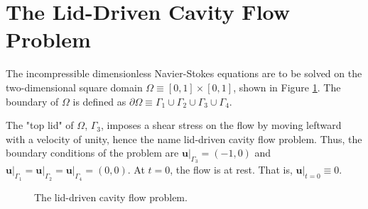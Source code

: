 \section{The Lid-Driven Cavity Flow Problem}

The incompressible dimensionless Navier-Stokes equations are to be solved on the two-dimensional square domain $\Omega \equiv \left[ 0, 1 \right] \times \left[ 0, 1 \right]$, shown in Figure \ref{fig:problem}. The boundary of $\Omega$ is defined as $\partial \Omega \equiv \Gamma_1 \cup \Gamma_2 \cup \Gamma_3 \cup \Gamma_4$. 

The "top lid" of $\Omega$, $\Gamma_3$, imposes a shear stress on the flow by moving leftward with a velocity of unity, hence the name lid-driven cavity flow problem. Thus, the boundary conditions of the problem are $\left. \mathbf{u} \right|_{\Gamma_3} = (-1, 0)$ and $\left. \mathbf{u} \right|_{\Gamma_1} = \left. \mathbf{u} \right|_{\Gamma_2} = \left. \mathbf{u} \right|_{\Gamma_4} = (0, 0)$. At $t = 0$, the flow is at rest. That is, $ \left. \mathbf{u} \right|_{t = 0} \equiv 0$.

\begin{figure}[ht]
    \centering
    \caption{The lid-driven cavity flow problem.}
    \label{fig:problem}
\end{figure}
